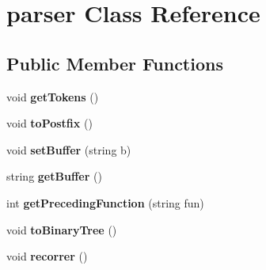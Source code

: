 \hypertarget{classparser}{\section{parser \-Class \-Reference}
\label{classparser}
}
\subsection*{\-Public \-Member \-Functions}
\begin{DoxyCompactItemize}
\item 
\hypertarget{classparser_a687f65a846f8b64a29b1d6c98173488b}{void {\bfseries get\-Tokens} ()}\label{classparser_a687f65a846f8b64a29b1d6c98173488b}

\item 
\hypertarget{classparser_ae2f5d621595f9f8eef3387e8947f128e}{void {\bfseries to\-Postfix} ()}\label{classparser_ae2f5d621595f9f8eef3387e8947f128e}

\item 
\hypertarget{classparser_ab08ffa6c47ae29b2a35f288e86230901}{void {\bfseries set\-Buffer} (string b)}\label{classparser_ab08ffa6c47ae29b2a35f288e86230901}

\item 
\hypertarget{classparser_a3bd38eb8f54a72327d87412f48c8ab6d}{string {\bfseries get\-Buffer} ()}\label{classparser_a3bd38eb8f54a72327d87412f48c8ab6d}

\item 
\hypertarget{classparser_a15693a69276680733f6afeab53dd8ae2}{int {\bfseries get\-Preceding\-Function} (string fun)}\label{classparser_a15693a69276680733f6afeab53dd8ae2}

\item 
\hypertarget{classparser_ad72820f089b18770ea378012f11e1c70}{void {\bfseries to\-Binary\-Tree} ()}\label{classparser_ad72820f089b18770ea378012f11e1c70}

\item 
\hypertarget{classparser_acfc3233229cd21a24a26077db68543b0}{void {\bfseries recorrer} ()}\label{classparser_acfc3233229cd21a24a26077db68543b0}

\end{DoxyCompactItemize}
